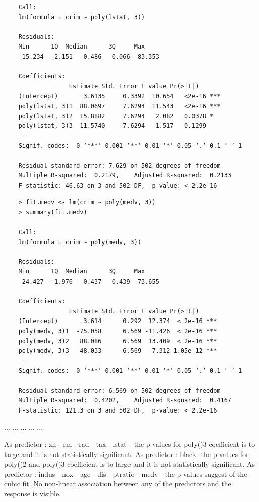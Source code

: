 \documentclass{article}
\begin{document}
\begin{itemize}
\begin{program}
\begin{verbatim}
	Call:
	lm(formula = crim ~ poly(lstat, 3))
	
	Residuals:
	Min      1Q  Median      3Q     Max 
	-15.234  -2.151  -0.486   0.066  83.353 
	
	Coefficients:
	              Estimate Std. Error t value Pr(>|t|)    
	(Intercept)       3.6135     0.3392  10.654   <2e-16 ***
	poly(lstat, 3)1  88.0697     7.6294  11.543   <2e-16 ***
	poly(lstat, 3)2  15.8882     7.6294   2.082   0.0378 *  
	poly(lstat, 3)3 -11.5740     7.6294  -1.517   0.1299    
	---
	Signif. codes:  0 ‘***’ 0.001 ‘**’ 0.01 ‘*’ 0.05 ‘.’ 0.1 ‘ ’ 1
	
	Residual standard error: 7.629 on 502 degrees of freedom
	Multiple R-squared:  0.2179,	Adjusted R-squared:  0.2133 
	F-statistic: 46.63 on 3 and 502 DF,  p-value: < 2.2e-16
	\end{verbatim}
\end{program}


\begin{program}
	\begin{verbatim}
	> fit.medv <- lm(crim ~ poly(medv, 3))
	> summary(fit.medv)
	
	Call:
	lm(formula = crim ~ poly(medv, 3))
	
	Residuals:
	Min      1Q  Median      3Q     Max 
	-24.427  -1.976  -0.437   0.439  73.655 
	
	Coefficients:
	              Estimate Std. Error t value Pr(>|t|)    
	(Intercept)       3.614      0.292  12.374  < 2e-16 ***
	poly(medv, 3)1  -75.058      6.569 -11.426  < 2e-16 ***
	poly(medv, 3)2   88.086      6.569  13.409  < 2e-16 ***
	poly(medv, 3)3  -48.033      6.569  -7.312 1.05e-12 ***
	---
	Signif. codes:  0 ‘***’ 0.001 ‘**’ 0.01 ‘*’ 0.05 ‘.’ 0.1 ‘ ’ 1
	
	Residual standard error: 6.569 on 502 degrees of freedom
	Multiple R-squared:  0.4202,	Adjusted R-squared:  0.4167 
	F-statistic: 121.3 on 3 and 502 DF,  p-value: < 2.2e-16	
	\end{verbatim}
\end{program}


\newpage
...
\newpage
 ...
 \newpage
 ...
 \newpage
 ...
 \newpage
 ...
 \newpage
 
 As predictor : zn - rm - rad - tax - lstat - the p-values for  poly()3 coefficient is to large and it is not  statistically significant.
 As predictor : black- the p-values for  poly()2 and poly()3 coefficient is to large and it is not statistically significant.
 As predictor : indus - nox - age - dis - ptratio - medv - the p-values suggest of the cubic fit.
No non-linear association between any of the predictors and the response  is visible.
\newpage




\end{itemize}
\end{document}

